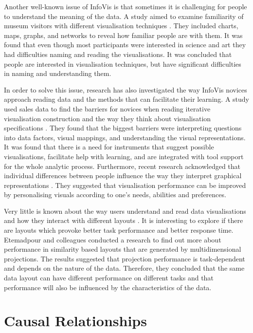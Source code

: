 \documentclass{l4proj}
\begin{document}
Another well-known issue of InfoVis is that sometimes it is challenging for people to understand the meaning of the data. A study aimed to examine familiarity of museum visitors with different visualisation techniques \cite{borner2015investigating}. They included charts, maps, graphs, and networks to reveal how familiar people are with them. It was found that even though most participants were interested in science and art they had difficulties naming and reading the visualisations. It was concluded that people are interested in visualisation techniques, but have significant difficulties in naming and understanding them. 

In order to solve this issue, research has also investigated the way InfoVis novices approach reading data and the methods that can facilitate their learning. A study used sales data to find the barriers for novices when reading iterative visualisation construction and the way they think about visualisation specifications \cite{grammel2010information}. They found that the biggest barriers were interpreting questions into data factors, visual mappings, and understanding the visual representations. It was found that there is a need for instruments that suggest possible visualisations, facilitate help with learning, and are integrated with tool support for the whole analytic process. Furthermore, recent research acknowledged that individual differences between people influence the way they interpret graphical representations \cite{Steichen:2013:UIV:2449396.2449439}. They suggested that visualisation performance can be improved by personalising visuals according to one's needs, abilities and preferences.

Very little is known about the way users understand and read data visualisations and how they interact with different layouts \cite{etemadpour2015perception}. It is interesting to explore if there are layouts which provoke better task performance and better response time. Etemadpour and colleagues \cite{etemadpour2015perception} conducted a research to find out more about performance in similarity based layouts that are generated by multidimensional projections. The results suggested that projection performance is task-dependent and depends on the nature of the data. Therefore, they concluded that the same data layout can have different performance on different tasks and that performance will also be influenced by the characteristics of the data.

\section{Causal Relationships}
\end{document}
